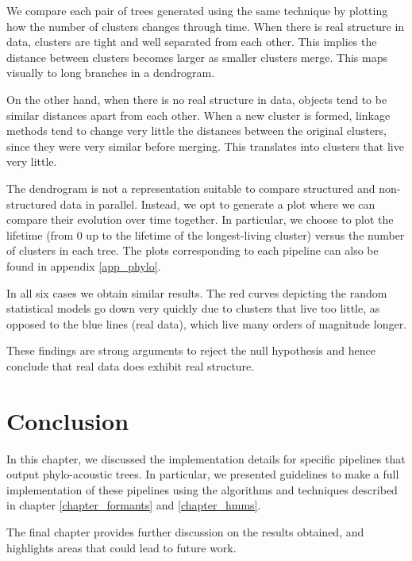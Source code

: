 \documentclass[../main.tex]{subfiles}
\begin{document}
\par We compare each pair of trees generated using the same technique by plotting how the number of clusters changes through time. When there is real structure in data, clusters are tight and well separated from each other. This implies the distance between clusters becomes larger as smaller clusters merge. This maps visually to long branches in a dendrogram. 
\par On the other hand, when there is no real structure in data, objects tend to be similar distances apart from each other. When a new cluster is formed, linkage methods tend to change very little the distances between the original clusters, since they were very similar before merging. This translates into clusters that live very little.
\par The dendrogram is not a representation suitable to compare structured and non-structured data in parallel. Instead, we opt to generate a plot where we can compare their evolution over time together. In particular, we choose to plot the lifetime (from 0 up to the lifetime of the longest-living cluster) versus the number of clusters in each tree. The plots corresponding to each pipeline can also be found in appendix \ref{app_phylo}.
\par In all six cases we obtain similar results. The red curves depicting the random statistical models go down very quickly due to clusters that live too little, as opposed to the blue lines (real data), which live many orders of magnitude longer.
\par These findings are strong arguments to reject the null hypothesis and hence conclude that real data does exhibit real structure.
\section{Conclusion}
In this chapter, we discussed the implementation details for specific pipelines that output phylo-acoustic trees. In particular, we presented guidelines to make a full implementation of these pipelines using the algorithms and techniques described in chapter \ref{chapter_formants} and \ref{chapter_hmms}.
\par The final chapter provides further discussion on the results obtained, and highlights areas that could lead to future work.
\end{document}
